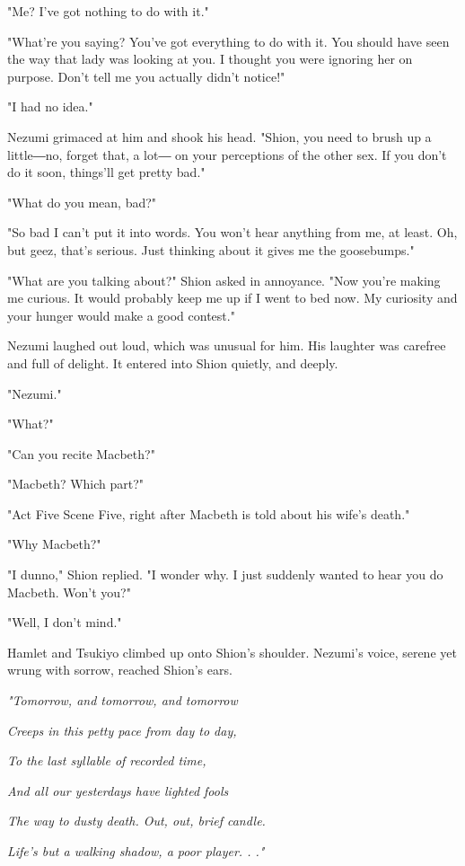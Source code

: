 "Me? I've got nothing to do with it."

"What're you saying? You've got everything to do with it. You should
have seen the way that lady was looking at you. I thought you were
ignoring her on purpose. Don't tell me you actually didn't notice!"

"I had no idea."

Nezumi grimaced at him and shook his head. "Shion, you need to brush up
a little―no, forget that, a lot― on your perceptions of the other sex.
If you don't do it soon, things'll get pretty bad."

"What do you mean, bad?"

"So bad I can't put it into words. You won't hear anything from me, at
least. Oh, but geez, that's serious. Just thinking about it gives me the
goosebumps."

"What are you talking about?" Shion asked in annoyance. "Now you're
making me curious. It would probably keep me up if I went to bed now. My
curiosity and your hunger would make a good contest."

Nezumi laughed out loud, which was unusual for him. His laughter was
carefree and full of delight. It entered into Shion quietly, and deeply.

"Nezumi."

"What?"

"Can you recite Macbeth?"

"Macbeth? Which part?"

"Act Five Scene Five, right after Macbeth is told about his wife's
death."

"Why Macbeth?"

"I dunno," Shion replied. "I wonder why. I just suddenly wanted to hear
you do Macbeth. Won't you?"

"Well, I don't mind."

Hamlet and Tsukiyo climbed up onto Shion's shoulder. Nezumi's voice,
serene yet wrung with sorrow, reached Shion's ears.

\emph{"Tomorrow, and tomorrow, and tomorrow}

\emph{Creeps in this petty pace from day to day,}

\emph{To the last syllable of recorded time,}

\emph{And all our yesterdays have lighted fools}

\emph{The way to dusty death. Out, out, brief candle.}

\emph{Life's but a walking shadow, a poor player. . ."}

